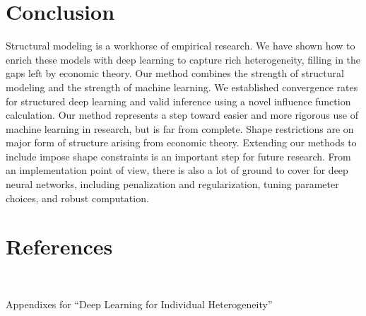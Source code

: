\documentclass[12pt]{article}
\numberwithin{equation}{section}
\theoremstyle{definition}
\begin{document}
\section{Conclusion}
	\label{sec:conclusion}

Structural modeling is a workhorse of empirical research. We have shown how to enrich these models with deep learning to capture rich heterogeneity, filling in the gaps left by economic theory. Our method combines the strength of structural modeling and the strength of machine learning. We established convergence rates for structured deep learning and valid inference using a novel influence function calculation. Our method represents a step toward easier and more rigorous use of machine learning in research, but is far from complete. Shape restrictions are on major form of structure arising from economic theory. Extending our methods to include impose shape constraints is an important step for future research. From an implementation point of view, there is also a lot of ground to cover for deep neural networks, including penalization and regularization, tuning parameter choices, and robust computation. 


	





\section{References}
\singlespacing
\begingroup
\renewcommand{\section}[2]{}	%
{}

\endgroup



\cleardoublepage


{}


\ \bigskip

\begin{center}
\LARGE
Appendixes for ``Deep Learning for Individual Heterogeneity'' 
\end{center}
	
\end{document}
